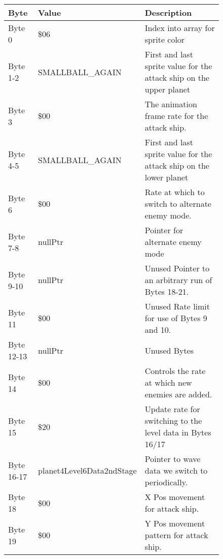 \begin{figure}[H]
  {
  \setlength{\tabcolsep}{3.0pt}
  \setlength\cmidrulewidth{\heavyrulewidth} %
  \begin{adjustbox}{width=12cm}

\begin{tabular}{lll}
\toprule
 Byte       & Value                     & Description                                                         \\
\midrule
 Byte 0     & \$06                       & Index into array for sprite color                                   \\
 Byte 1-2   & SMALLBALL\_AGAIN           & First and last sprite value for the attack ship on the upper planet \\
 Byte 3     & \$00                       & The animation frame rate for the attack ship.                       \\
 Byte 4-5   & SMALLBALL\_AGAIN           & First and last sprite value for the attack ship on the lower planet \\
 Byte 6     & \$00                       & Rate at which to switch to alternate enemy mode.                    \\
 Byte 7-8   & nullPtr                   & Pointer for alternate enemy mode                                    \\
 Byte 9-10  & nullPtr                   & Unused Pointer to an arbitrary run of Bytes 18-21.                  \\
 Byte 11    & \$00                       & Unused Rate limit for use of Bytes 9 and 10.                        \\
 Byte 12-13 & nullPtr                   & Unused Bytes                                                        \\
 Byte 14    & \$00                       & Controls the rate at which new enemies are added.                   \\
 Byte 15    & \$20                       & Update rate for switching to the level data in Bytes 16/17          \\
 Byte 16-17 & planet4Level6Data2ndStage & Pointer to wave data we switch to periodically.                     \\
 Byte 18    & \$00                       & X Pos movement for attack ship.                                     \\
 Byte 19    & \$00                       & Y Pos movement pattern for attack ship.                             \\

\end{tabular}
\end{adjustbox}}
\end{figure}
